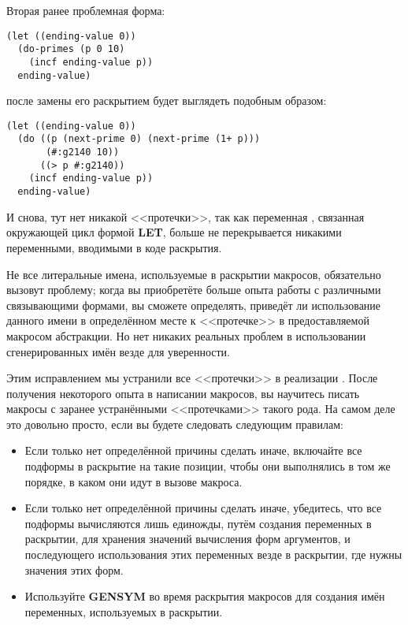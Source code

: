 Вторая ранее проблемная форма:

\begin{lstlisting}
(let ((ending-value 0))
  (do-primes (p 0 10)
    (incf ending-value p))
  ending-value)
\end{lstlisting}

после замены  его раскрытием будет выглядеть подобным образом:

\begin{lstlisting}
(let ((ending-value 0))
  (do ((p (next-prime 0) (next-prime (1+ p)))
       (#:g2140 10))
      ((> p #:g2140))
    (incf ending-value p))
  ending-value)
\end{lstlisting}

И снова, тут нет никакой <<протечки>>, так как переменная , связанная
окружающей цикл  формой \textbf{LET}, больше не перекрывается никакими
переменными, вводимыми в коде раскрытия.

Не все литеральные имена, используемые в раскрытии макросов, обязательно вызовут проблему;
когда вы приобретёте больше опыта работы с различными связывающими формами, вы сможете
определять, приведёт ли использование данного имени в определённом месте к <<протечке>> в
предоставляемой макросом абстракции. Но нет никаких реальных проблем в использовании
сгенерированных имён везде для уверенности.

Этим исправлением мы устранили все <<протечки>> в реализации . После
получения некоторого опыта в написании макросов, вы научитесь писать макросы с заранее
устранёнными <<протечками>> такого рода. На самом деле это довольно просто, если вы будете
следовать следующим правилам:
\begin{itemize}
\item Если только нет определённой причины сделать иначе, включайте все подформы в
  раскрытие на такие позиции, чтобы они выполнялись в том же порядке, в каком они идут в
  вызове макроса.
\item Если только нет определённой причины сделать иначе, убедитесь, что все подформы
  вычисляются лишь единожды, путём создания переменных в раскрытии, для хранения значений
  вычисления форм аргументов, и последующего использования этих переменных везде в
  раскрытии, где нужны значения этих форм.
\item Используйте \textbf{GENSYM} во время раскрытия макросов для создания имён
  переменных, используемых в раскрытии.
\end{itemize}

